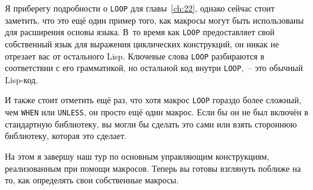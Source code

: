 Я приберегу подробности о \lstinline{LOOP} для главы~\ref{ch:22}, однако сейчас стоит заметить,
что это ещё один пример того, как макросы могут быть использованы для расширения основы
языка. В~то время как \lstinline{LOOP} предоставляет свой собственный язык для выражения
циклических конструкций, он никак не отрезает вас от остального Lisp. Ключевые слова
\lstinline{LOOP} разбираются в соответствии с его грамматикой, но остальной код внутри
\lstinline{LOOP},~-- это обычный Lisp-код.

И также стоит отметить ещё раз, что хотя макрос \lstinline{LOOP} гораздо более сложный, чем
\lstinline{WHEN} или \lstinline{UNLESS}, он просто ещё один макрос. Если бы он не был включён в
стандартную библиотеку, вы могли бы сделать это сами или взять стороннюю библиотеку,
которая это сделает.

На этом я завершу наш тур по основным управляющим конструкциям, реализованным при помощи
макросов. Теперь вы готовы взглянуть поближе на то, как определять свои собственные
макросы.

